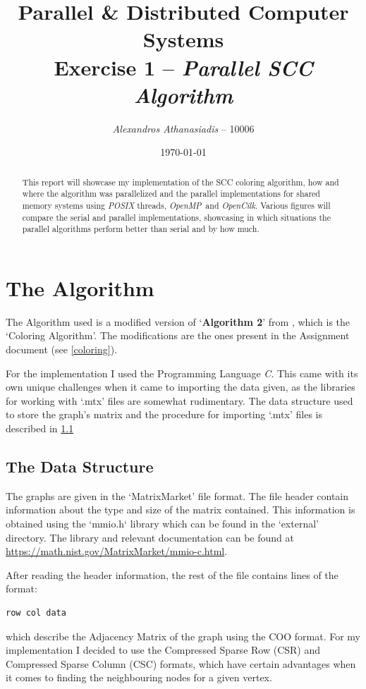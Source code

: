\documentclass[10pt, a4paper]{article}
\newcommand{\pthread}{\textit{POSIX} threads}
\newcommand{\cilk}{\textit{OpenCilk}}
\newcommand{\omp}{\textit{OpenMP}}
\newcommand{\C}{\textit{C}}
\begin{document}
\title{
	\textbf{Parallel \& Distributed Computer Systems}\\
	Exercise 1 -- \textit{Parallel SCC Algorithm}
}
\author{\textit{Alexandros Athanasiadis} -- 10006}
\date{\today}

\maketitle

\begin{abstract}
	\noindent
	This report will showcase my implementation of the SCC coloring algorithm,
	how and where the algorithm was parallelized and the parallel implementations 
	for shared memory systems using \pthread, \omp \ and \cilk. Various figures will compare the 
	serial and parallel implementations, showcasing in which situations the 
	parallel algorithms perform better than serial and by how much.
\end{abstract}

\section{The Algorithm} \label{algorithm}
The Algorithm used is a modified version of `\textbf{Algorithm 2}' from \cite{slota2014}, which
is the `Coloring Algorithm'. The modifications are the ones present in the Assignment document 
(see \ref{coloring}). 

For the implementation I used the Programming Language \C. This came with its own unique challenges when
it came to importing the data given, as the libraries for working with `.mtx' files are somewhat rudimentary. 
The data structure used to store the graph's matrix and the procedure for importing `.mtx' files is described in
\ref{data}

\subsection{The Data Structure} \label{data}
The graphs are given in the `MatrixMarket' file format. The file header contain information about the type
and size of the matrix contained. This information is obtained using the `mmio.h` library which
can be found in the `external' directory. The library and relevant documentation can be found
at \url{https://math.nist.gov/MatrixMarket/mmio-c.html}.

After reading the header information, the rest of the file contains lines of the format:
\begin{verbatim}
row col data
\end{verbatim}
which describe the Adjacency Matrix of the graph using the COO format. For my implementation
I decided to use the Compressed Sparse Row (CSR) and Compressed Sparse Column (CSC) formats, which
have certain advantages when it comes to finding the neighbouring nodes for a given vertex. 
\end{document}
